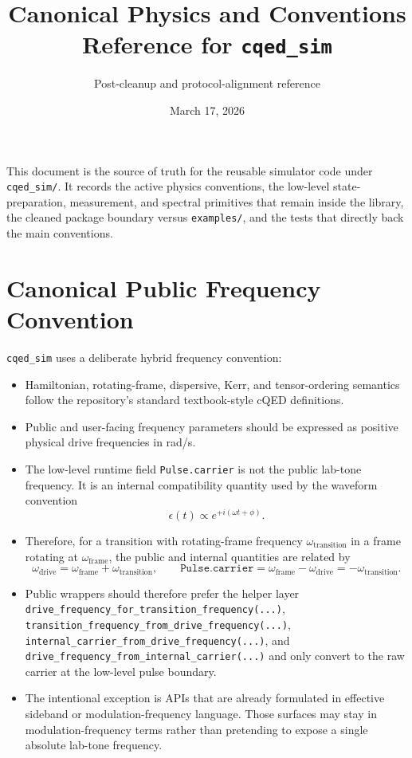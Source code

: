 \documentclass[11pt]{article}
\title{Canonical Physics and Conventions Reference for \texttt{cqed\_sim}}
\author{Post-cleanup and protocol-alignment reference}
\date{March 17, 2026}
\begin{document}
\maketitle

\noindent
This document is the source of truth for the reusable simulator code under
\texttt{cqed\_sim/}. It records the active physics conventions, the low-level
state-preparation, measurement, and spectral primitives that remain inside the
library, the cleaned package boundary versus \texttt{examples/}, and the tests
that directly back the main conventions.

\section{Canonical Public Frequency Convention}
\texttt{cqed\_sim} uses a deliberate hybrid frequency convention:
\begin{itemize}[leftmargin=1.5em]
  \item Hamiltonian, rotating-frame, dispersive, Kerr, and tensor-ordering
  semantics follow the repository's standard textbook-style cQED definitions.
  \item Public and user-facing frequency parameters should be expressed as
  positive physical drive frequencies in rad/s.
  \item The low-level runtime field \texttt{Pulse.carrier} is not the public
  lab-tone frequency. It is an internal compatibility quantity used by the
  waveform convention
  \[
  \epsilon(t) \propto e^{+i(\omega t + \phi)}.
  \]
  \item Therefore, for a transition with rotating-frame frequency
  \(\omega_{\mathrm{transition}}\) in a frame rotating at
  \(\omega_{\mathrm{frame}}\), the public and internal quantities are related by
  \[
  \omega_{\mathrm{drive}} = \omega_{\mathrm{frame}} + \omega_{\mathrm{transition}},
  \qquad
  \texttt{Pulse.carrier} = \omega_{\mathrm{frame}} - \omega_{\mathrm{drive}} = -\omega_{\mathrm{transition}}.
  \]
  \item Public wrappers should therefore prefer the helper layer
  \texttt{drive\_frequency\_for\_transition\_frequency(...)},
  \texttt{transition\_frequency\_from\_drive\_frequency(...)},
  \texttt{internal\_carrier\_from\_drive\_frequency(...)}, and
  \texttt{drive\_frequency\_from\_internal\_carrier(...)} and only convert to
  the raw carrier at the low-level pulse boundary.
  \item The intentional exception is APIs that are already formulated in
  effective sideband or modulation-frequency language. Those surfaces may stay
  in modulation-frequency terms rather than pretending to expose a single
  absolute lab-tone frequency.
\end{itemize}
\end{document}
